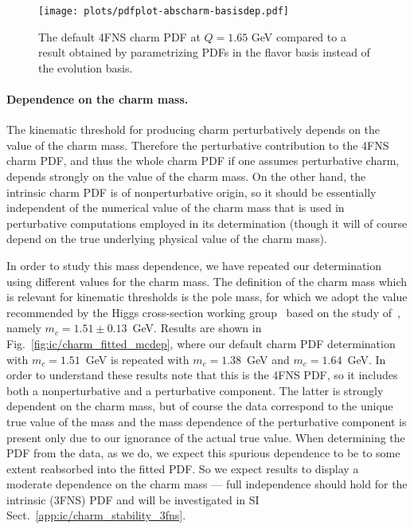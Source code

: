 \begin{figure}[t!]
  \begin{center}
    \texttt{[image: plots/pdfplot-abscharm-basisdep.pdf]}
    \caption{\small The default 4FNS charm PDF at $Q=1.65$ GeV
    compared to a result obtained by parametrizing PDFs in the flavor
    basis instead of the evolution basis. 
  \label{fig:ic/charm_basisdep} }
\end{center}
\end{figure}

\paragraph{Dependence on the charm mass.}
%
The kinematic threshold for producing charm perturbatively depends on
the value of the charm mass. Therefore the perturbative contribution
to the 4FNS charm PDF, and thus the whole charm PDF if one assumes
perturbative charm, depends strongly on the value of the charm
mass.
On the other hand, the intrinsic charm PDF is of nonperturbative
origin, so it should be essentially independent of the numerical value of the
charm mass that is used in  perturbative computations employed in  its 
determination (though it will of course depend on the true underlying 
physical value of the charm mass).

In order to study this mass dependence, we have repeated our determination using different values for the charm mass.
The definition of the charm mass which is relevant for kinematic
thresholds is the pole mass, for which we adopt the value recommended
by the Higgs cross-section working group~
based on the study of~, namely
 $m_c = 1.51 \pm 0.13$~GeV. 
%
Results are shown in Fig.~\ref{fig:ic/charm_fitted_mcdep}, where
our default charm PDF determination with  $m_c = 1.51$~GeV is
repeated with $m_c=1.38$~GeV and
$m_c=1.64$~GeV.
%
In order to understand these results note that this is
the 4FNS PDF, so it includes 
both a nonperturbative and a perturbative component. The latter is
strongly dependent on the charm mass, but of course the data
correspond to the unique true value of the mass and the mass
dependence of the perturbative component is present only due to our
ignorance of the actual true value. When determining the PDF from the
data, as we do, we expect this spurious dependence to be to some extent
reabsorbed into the fitted PDF. So we expect results to display a
moderate dependence on the charm mass --- full independence should
hold for the intrinsic (3FNS) PDF and will be investigated in
SI Sect.~\ref{app:ic/charm_stability_3fns}. 

